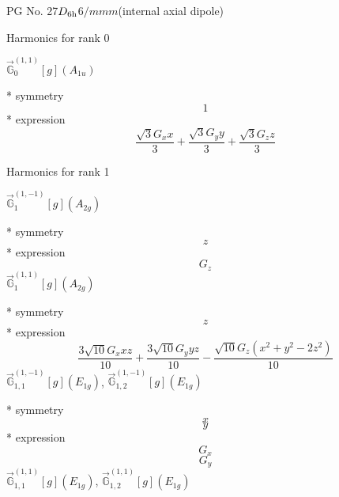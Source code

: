 \documentclass[fleqn,8pt]{jsarticle}
\begin{document}
\setcounter{MaxMatrixCols}{32}

\renewcommand{\tablename}{Table~}
\renewcommand{\figurename}{Figure~}
\begin{center}
\LARGE
PG No. 27\quad$D_{\rm 6h}$\quad$6/mmm$\quad[ hexagonal ] (internal axial dipole)
\end{center}

\noindent * Harmonics for rank 0

\noindent\quad $\vec{\mathbb{G}}_{0}^{(1,1)}[g](A_{1u})$

\noindent\quad ** symmetry
\begin{dmath*}
1
\end{dmath*}
\noindent\quad ** expression
\begin{dmath*}
\frac{\sqrt{3} G_{x} x}{3} + \frac{\sqrt{3} G_{y} y}{3} + \frac{\sqrt{3} G_{z} z}{3}
\end{dmath*}

\noindent * Harmonics for rank 1

\noindent\quad $\vec{\mathbb{G}}_{1}^{(1,-1)}[g](A_{2g})$

\noindent\quad ** symmetry
\begin{dmath*}
z
\end{dmath*}
\noindent\quad ** expression
\begin{dmath*}
G_{z}
\end{dmath*}
\noindent\quad $\vec{\mathbb{G}}_{1}^{(1,1)}[g](A_{2g})$

\noindent\quad ** symmetry
\begin{dmath*}
z
\end{dmath*}
\noindent\quad ** expression
\begin{dmath*}
\frac{3 \sqrt{10} G_{x} x z}{10} + \frac{3 \sqrt{10} G_{y} y z}{10} - \frac{\sqrt{10} G_{z} \left(x^{2} + y^{2} - 2 z^{2}\right)}{10}
\end{dmath*}
\noindent\quad $\vec{\mathbb{G}}_{1,1}^{(1,-1)}[g](E_{1g})$, $\vec{\mathbb{G}}_{1,2}^{(1,-1)}[g](E_{1g})$

\noindent\quad ** symmetry
\begin{dmath*}
x
\end{dmath*}
\begin{dmath*}
y
\end{dmath*}
\noindent\quad ** expression
\begin{dmath*}
G_{x}
\end{dmath*}
\begin{dmath*}
G_{y}
\end{dmath*}
\noindent\quad $\vec{\mathbb{G}}_{1,1}^{(1,1)}[g](E_{1g})$, $\vec{\mathbb{G}}_{1,2}^{(1,1)}[g](E_{1g})$
\end{document}
